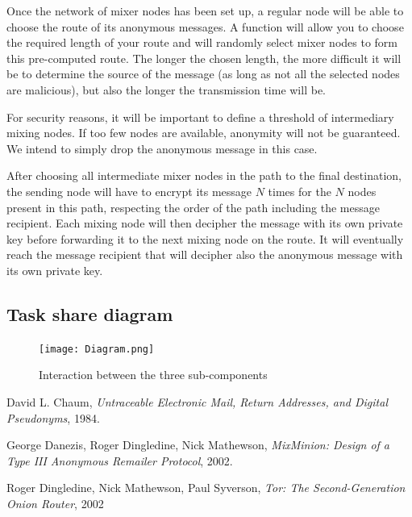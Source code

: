 \documentclass[11pt, a4paper]{article}
\begin{document}
            Once the network of mixer nodes has been set up, a regular node will be able to choose the route of its anonymous messages.
            A function will allow you to choose the required length of your route and will randomly select mixer nodes to form this pre-computed route.
            The longer the chosen length, the more difficult it will be to determine the source of the message (as long as not all the selected nodes are malicious), but also the longer the transmission time will be.

            For security reasons, it will be important to define a threshold of intermediary mixing nodes.
            If too few nodes are available, anonymity will not be guaranteed.
            We intend to simply drop the anonymous message in this case.

            After choosing all intermediate mixer nodes in the path to the final destination, the sending node will have to encrypt its message $N$ times for the $N$ nodes present in this path, respecting the order of the path including the message recipient.
            Each mixing node will then decipher the message with its own private key before forwarding it to the next mixing node on the route.
            It will eventually reach the message recipient that will decipher also the anonymous message with its own private key.

    \subsection{Task share diagram}


\begin{figure}[h!]
  \texttt{[image: Diagram.png]}
  \caption{Interaction between the three sub-components}
  \label{fig:taskdiagram}
\end{figure}


\begin{thebibliography}{9}

  David L. Chaum,
  \textit{Untraceable Electronic Mail, Return Addresses, and Digital Pseudonyms},
  1984.

  George Danezis, Roger Dingledine, Nick Mathewson,
  \textit{MixMinion: Design of a Type III Anonymous Remailer Protocol},
  2002.

    Roger Dingledine, Nick Mathewson, Paul Syverson,
    \textit{Tor: The Second-Generation Onion Router},
    2002

\end{thebibliography}
\end{document}
